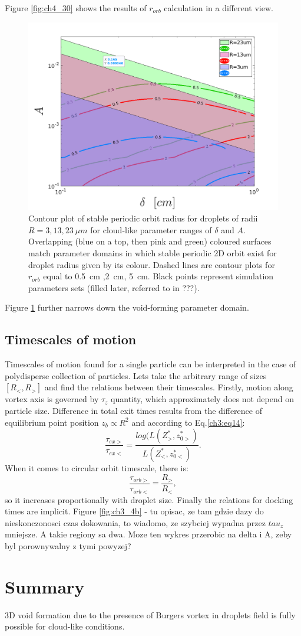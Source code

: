 \documentclass[../main.tex]{subfiles}
\begin{document}
Figure \ref{fig:ch4_30} shows the results of $r_{orb}$ calculation in a different view. 
\begin{figure}
\centering
\noindent \includegraphics[width=30pc]{gfx/void_radii_R_3_13_23.png}
\caption{Contour plot of stable periodic orbit radius for droplets of radii $R=3,13,23 \ \mu m$ for cloud-like parameter ranges of $\delta$ and $A$. Overlapping (blue on a top, then pink and green) coloured surfaces match parameter domains in which stable periodic 2D orbit exist for droplet radius given by its colour. Dashed lines are contour plots for $r_{orb}$ equal to 0.5~cm ,2~cm, 5~cm. Black points represent simulation parameters sets (filled later, referred to in ???).}
\label{fig:ch4_7}
\end{figure}

Figure \ref{fig:ch4_7} further narrows down the void-forming parameter domain.

\subsection{Timescales of motion}
Timescales of motion found for a single particle can be interpreted in the case of polydisperse collection of particles. Lets take the arbitrary range of sizes $[R_<,R_>]$ and find the relations between their timescales. Firstly, motion along vortex axis is governed by $\tau_z$ quantity, which approximately does not depend on particle size. Difference in total exit times results from the difference of equilibrium point position $z_b \propto R^2$ and according to Eq.\ref{ch3:eq14}:
\begin{equation}
\frac{\tau_{ex >}}{\tau_{ex <}}=\frac{log(L(Z^*_>,z_{0 >}^*)}{L(Z^*_<,z_{0 <}^*)}.
\label{ch4:eq1}
\end{equation}
When it comes to circular orbit timescale, there is:
\begin{equation}
\frac{\tau_{orb >}}{\tau_{orb <}}=\frac{R_>}{R_<},
\label{ch4:eq2}
\end{equation}
so it increases proportionally with droplet size. Finally the relations for docking times are implicit. Figure \autoref{fig:ch3_4b} - tu opisac, ze tam gdzie dazy do nieskonczonosci czas dokowania, to wiadomo, ze szybciej wypadna przez $tau_z$ mniejsze. A takie regiony sa dwa. Moze ten wykres przerobic na delta i A, zeby byl porownywalny z tymi powyzej?
\section{Summary}
3D void formation due to the presence of Burgers vortex in droplets field is fully possible for cloud-like conditions.
\end{document}
